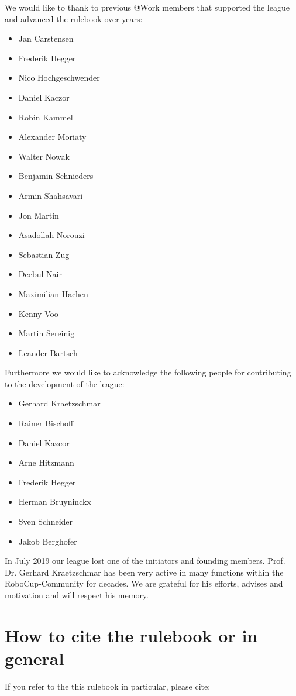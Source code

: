 \begin{titlepage}
We would like to thank to previous @Work members that supported the league and advanced the rulebook over years:
\begin{itemize}
\item Jan Carstensen 
\item Frederik Hegger
\item Nico Hochgeschwender 
\item Daniel Kaczor 
\item Robin Kammel 
\item Alexander Moriaty 
\item Walter Nowak 
\item Benjamin Schnieders
\item Armin Shahsavari 
\item Jon Martin 
\item Asadollah Norouzi
\item Sebastian Zug
\item Deebul Nair
\item Maximilian Hachen
\item Kenny Voo
\item Martin Sereinig
\item Leander Bartsch
\end{itemize}


Furthermore we would like to acknowledge the following people for contributing to the development
of the \RCAW league:

\begin{itemize}
	\item Gerhard Kraetzschmar
	\item Rainer Bischoff
	\item Daniel Kazcor
	\item Arne Hitzmann
	\item Frederik Hegger
	\item Herman Bruyninckx
	\item Sven Schneider
	\item Jakob Berghofer
\end{itemize}
In July 2019 our league lost one of the initiators and founding members. Prof. Dr. Gerhard
Kraetzschmar has been very active in many functions within the RoboCup-Community
for decades. We are grateful for his efforts, advises and motivation and will respect his memory.


\begin{minipage}{\textwidth}
\section*{How to cite the rulebook or \RCAW in general}
If you refer to the this rulebook in particular, please cite:


\end{minipage}
\end{titlepage}
